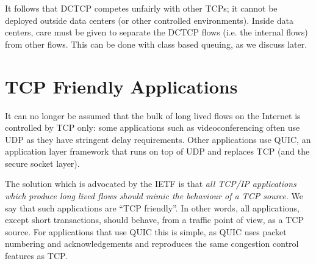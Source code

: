 %
%
%
It follows that DCTCP competes unfairly with other TCPs; it cannot be deployed outside data centers (or other controlled environments). Inside data centers, care must be given to separate the DCTCP flows (i.e. the internal flows) from other flows. This can be done with class based queuing, as we discuss later.




\section{TCP Friendly Applications}

It can no longer be assumed that the bulk of long lived flows on the
Internet is controlled by TCP only: some applications such as videoconferencing often use UDP as they have stringent delay requirements. Other applications use
QUIC, an application layer framework that runs on top of UDP and replaces TCP (and the secure socket layer).


The solution which is advocated by the IETF is that \emph{all
TCP/IP applications which produce long lived flows should mimic
the behaviour of a TCP source}. We say that such applications are
``TCP friendly''. In other words, all applications, except short
transactions, should behave, from a traffic point of view, as a
TCP source.
For applications that use QUIC this is simple, as QUIC uses packet numbering and acknowledgements and reproduces the same congestion control features as TCP.


